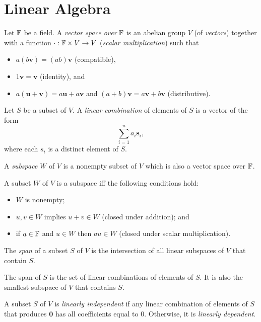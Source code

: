 \chapter{Linear Algebra}
\begin{defn}
  Let $\mathbb{F}$ be a field. A \emph{vector space over} $\mathbb{F}$ is an abelian group
  $V$ (of \emph{vectors})
  together with a function $\cdot:\mathbb{F}\times V\to V$ (\emph{scalar
    multiplication}) such that
  \begin{itemize}
    \item $a(b\mathbf v)=(ab)\mathbf v$ (compatible),
    \item $1\mathbf v=\mathbf v$ (identity), and
    \item $a(\mathbf u+\mathbf v)=a\mathbf u+a\mathbf v$ and $(a+b)\mathbf
      v=a\mathbf v+b\mathbf v$ (distributive).
  \end{itemize}
\end{defn}
\begin{defn}
  Let $S$ be a subset of $V$. A \emph{linear combination} of elements of $S$ is
  a vector of the form \[\sum_{i=1}^n a_i\mathbf s_i,\] where each $s_i$ is a
  distinct element of $S$.
\end{defn}
\begin{defn}
  A \emph{subspace} $W$ of $V$ is a nonempty subset of $V$ which is also a
  vector space over $\mathbb{F}$.
\end{defn}
\begin{prop}
  A subset $W$ of $V$ is a subspace iff the following conditions hold:
  \begin{itemize}
    \item $W$ is nonempty;
    \item $u,v\in W$ implies $u+v\in W$ (closed under addition); and
    \item if $a\in\mathbb{F}$ and $u\in W$ then $au\in W$ (closed under scalar
      multiplication).
  \end{itemize}
\end{prop}
\begin{defn}
  The \emph{span} of a subset $S$ of $V$ is the intersection of all linear
  subspaces of $V$ that contain $S$.  
\end{defn}
\begin{prop}
  The span of $S$ is the set of linear combinations of elements of $S$. It is
  also the smallest subspace of $V$ that contains $S$.
\end{prop}
\begin{defn}
  A subset $S$ of $V$ is \emph{linearly independent} if any linear combination
  of elements of $S$ that produces $\mathbf 0$ has all coefficients equal to $0$.
  Otherwise, it is \emph{linearly dependent}.
\end{defn}
